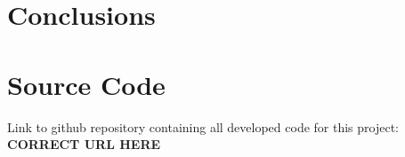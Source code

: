 \documentclass
[twocolumn,
secnumarabic,
nobibnotes,
aps,
prl,
reprint,
groupedaddress,
amsmath,
amssymb,
]{revtex4-2}
\begin{document}
\section{Conclusions}

\appendix

\section{Source Code}
\label{sec:sc}
Link to github repository containing all developed code for this project: \textbf{CORRECT URL HERE}%





\end{document}
